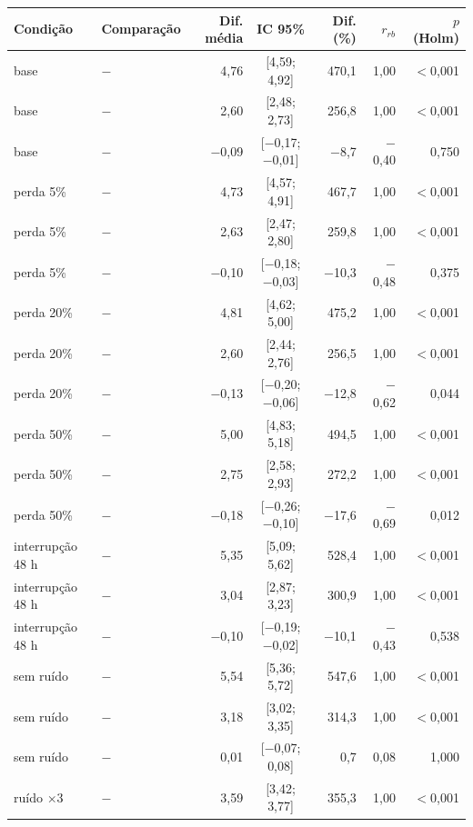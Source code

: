 \begin{tabular}{@{}llrcrrr@{}}
\toprule
Condição & Comparação & Dif. média & IC 95\% & Dif. (\%) & $r_{rb}$ & $p$ (Holm) \\
\midrule
base & \polBOR{} $-$ \polA{} & 4,76 & [4,59; 4,92] & 470,1 & 1,00 & $<$0,001 \\
base & \polC{} $-$ \polA{} & 2,60 & [2,48; 2,73] & 256,8 & 1,00 & $<$0,001 \\
base & \polD{} $-$ \polA{} & $-$0,09 & [$-$0,17; $-$0,01] & $-$8,7 & $-$0,40 & 0,750 \\
perda 5\% & \polBOR{} $-$ \polA{} & 4,73 & [4,57; 4,91] & 467,7 & 1,00 & $<$0,001 \\
perda 5\% & \polC{} $-$ \polA{} & 2,63 & [2,47; 2,80] & 259,8 & 1,00 & $<$0,001 \\
perda 5\% & \polD{} $-$ \polA{} & $-$0,10 & [$-$0,18; $-$0,03] & $-$10,3 & $-$0,48 & 0,375 \\
perda 20\% & \polBOR{} $-$ \polA{} & 4,81 & [4,62; 5,00] & 475,2 & 1,00 & $<$0,001 \\
perda 20\% & \polC{} $-$ \polA{} & 2,60 & [2,44; 2,76] & 256,5 & 1,00 & $<$0,001 \\
perda 20\% & \polD{} $-$ \polA{} & $-$0,13 & [$-$0,20; $-$0,06] & $-$12,8 & $-$0,62 & 0,044 \\
perda 50\% & \polBOR{} $-$ \polA{} & 5,00 & [4,83; 5,18] & 494,5 & 1,00 & $<$0,001 \\
perda 50\% & \polC{} $-$ \polA{} & 2,75 & [2,58; 2,93] & 272,2 & 1,00 & $<$0,001 \\
perda 50\% & \polD{} $-$ \polA{} & $-$0,18 & [$-$0,26; $-$0,10] & $-$17,6 & $-$0,69 & 0,012 \\
interrupção 48 h & \polBOR{} $-$ \polA{} & 5,35 & [5,09; 5,62] & 528,4 & 1,00 & $<$0,001 \\
interrupção 48 h & \polC{} $-$ \polA{} & 3,04 & [2,87; 3,23] & 300,9 & 1,00 & $<$0,001 \\
interrupção 48 h & \polD{} $-$ \polA{} & $-$0,10 & [$-$0,19; $-$0,02] & $-$10,1 & $-$0,43 & 0,538 \\
sem ruído & \polBOR{} $-$ \polA{} & 5,54 & [5,36; 5,72] & 547,6 & 1,00 & $<$0,001 \\
sem ruído & \polC{} $-$ \polA{} & 3,18 & [3,02; 3,35] & 314,3 & 1,00 & $<$0,001 \\
sem ruído & \polD{} $-$ \polA{} & 0,01 & [$-$0,07; 0,08] & 0,7 & 0,08 & 1,000 \\
ruído $\times$3 & \polBOR{} $-$ \polA{} & 3,59 & [3,42; 3,77] & 355,3 & 1,00 & $<$0,001 \\

\end{tabular}
